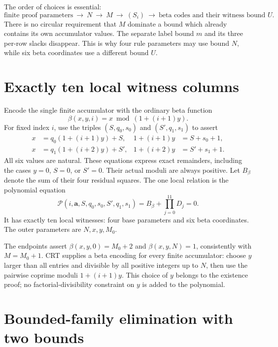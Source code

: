 \documentclass[11pt,a4paper]{article}
\theoremstyle{definition}\newtheorem{definition}[theorem]{Definition}
\theoremstyle{remark}\newtheorem{remark}[theorem]{Remark}
\numberwithin{equation}{section}
\begin{document}
The order of choices is essential:
\[
 \text{finite proof parameters}\ \longrightarrow\ N
 \ \longrightarrow\ M\ \longrightarrow\ (S_i)
 \ \longrightarrow\ \text{beta codes and their witness bound }U.
\]
There is no circular requirement that \(M\) dominate a bound which
already contains its own accumulator values. The separate label bound
\(m\) and its three per-row slacks disappear. This is why four rule
parameters may use bound \(N\), while six beta coordinates use a
different bound \(U\).

\section{Exactly ten local witness columns}
\label{sec:ten}

Encode the single finite accumulator with the ordinary beta function
\[
 \beta(x,y,i)=x\bmod(1+(i+1)y).
\]
For fixed index \(i\), use the triples
\((S,q_0,s_0)\) and \((S',q_1,s_1)\) to assert
\begin{align}
 x&=q_0(1+(i+1)y)+S,&
 1+(i+1)y&=S+s_0+1,\nonumber\\
 x&=q_1(1+(i+2)y)+S',&
 1+(i+2)y&=S'+s_1+1.
\label{eq:beta}
\end{align}
All six values are natural. These equations express exact remainders,
including the cases \(y=0\), \(S=0\), or \(S'=0\). Their actual
moduli are always positive. Let \(B_\beta\) denote the sum of their
four residual squares. The one local relation is the polynomial equation
\begin{equation}
 \mathcal P(i,\boldsymbol a,S,q_0,s_0,S',q_1,s_1)
 =B_\beta+\prod_{j=0}^{11}D_j=0.
\label{eq:local}
\end{equation}
It has exactly ten local witnesses: four base parameters and six beta
coordinates. The outer parameters are \(N,x,y,M_0\).

The endpoints assert
\(\beta(x,y,0)=M_0+2\) and \(\beta(x,y,N)=1\), consistently with
\(M=M_0+1\). CRT supplies a beta encoding for every finite accumulator:
choose \(y\) larger than all entries and divisible by all positive
integers up to \(N\), then use the pairwise coprime moduli
\(1+(i+1)y\). This choice of \(y\) belongs to the existence proof;
no factorial-divisibility constraint on \(y\) is added to the polynomial.

\section{Bounded-family elimination with two bounds}
\label{sec:crt}
\end{document}
